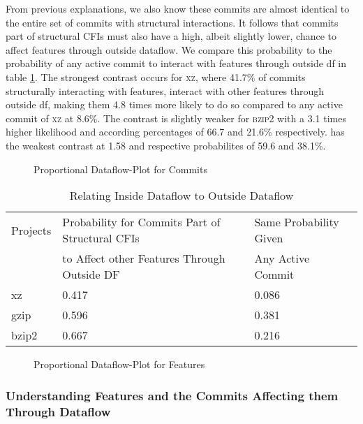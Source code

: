 From previous explanations, we also know these commits are almost identical to the entire set of commits with structural interactions.
It follows that commits part of structural CFIs must also have a high, albeit slightly lower, chance to affect features through outside dataflow.
We compare this probability to the probability of any active commit to interact with features through outside df in table \ref{tab:commit_dfbr_rel_table}.
The strongest contrast occurs for \textsc{xz}, where 41.7\% of commits structurally interacting with features, interact with other features through outside df, making them 4.8 times more likely to do so compared to any active commit of \textsc{xz} at 8.6\%.
The contrast is slightly weaker for \textsc{bzip2} with a 3.1 times higher likelihood and according percentages of 66.7 and 21.6\% respectively. 
 has the weakest contrast at 1.58 and respective probabilites of 59.6 and 38.1\%. 

\begin{figure}[htbp]
  \centering
  
  \caption{Proportional Dataflow-Plot for Commits}
  \label{fig:commit_dfbr_plot}
\end{figure}

\begin{table}[t]
\caption{Relating Inside Dataflow to Outside Dataflow}
\label{tab:commit_dfbr_rel_table}
\begin{tabular}{lll}
 Projects & Probability for Commits Part of Structural CFIs & Same Probability Given 	\\
 	  & to Affect other Features Through Outside DF     & Any Active Commit		\\
xz & 0.417 & 0.086 \\
gzip & 0.596 & 0.381 \\
bzip2 & 0.667 & 0.216 \\
\end{tabular}
\end{table}

\clearpage

\begin{figure}[htbp]
  \centering
  
  \caption{Proportional Dataflow-Plot for Features}
  \label{fig:feature_dfbr_plot}
\end{figure}

\clearpage

\subsubsection*{Understanding Features and the Commits Affecting them Through Dataflow}\label{sec:eval_feature_dfbr}

